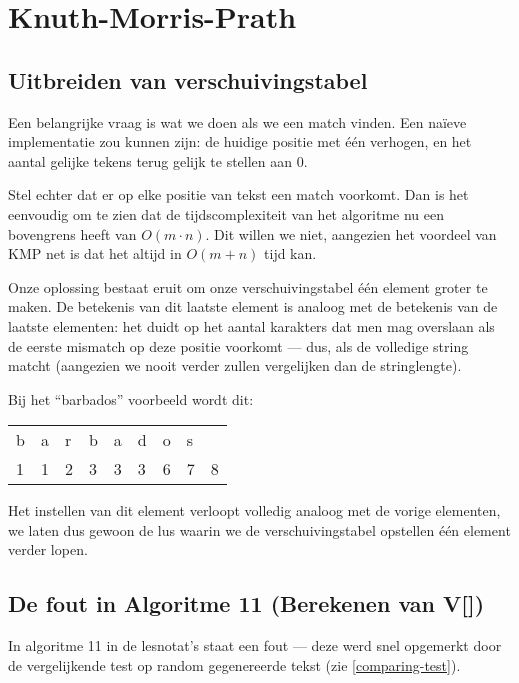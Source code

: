 \documentclass[a4paper,11pt]{article}
\begin{document}
\section{Knuth-Morris-Prath}

\subsection{Uitbreiden van verschuivingstabel}

Een belangrijke vraag is wat we doen als we een match vinden. Een na\"ieve
implementatie zou kunnen zijn: de huidige positie met \'e\'en verhogen, en het
aantal gelijke tekens terug gelijk te stellen aan 0.

Stel echter dat er op elke positie van tekst een match voorkomt. Dan is
het eenvoudig om te zien dat de tijdscomplexiteit van het algoritme nu een
bovengrens heeft van $O(m \cdot n)$. Dit willen we niet, aangezien het voordeel
van KMP net is dat het altijd in $O(m + n)$ tijd kan.

Onze oplossing bestaat eruit om onze verschuivingstabel \'e\'en element groter
te maken. De betekenis van dit laatste element is analoog met de betekenis van
de laatste elementen: het duidt op het aantal karakters dat men mag overslaan
als de eerste mismatch op deze positie voorkomt — dus, als de volledige string
matcht (aangezien we nooit verder zullen vergelijken dan de stringlengte).

Bij het “barbados” voorbeeld wordt dit:

\begin{center}
\begin{tabular}{lllllllll}
b & a & r & b & a & d & o & s &   \\
1 & 1 & 2 & 3 & 3 & 3 & 6 & 7 & 8 \\
\end{tabular}
\end{center}

Het instellen van dit element verloopt volledig analoog met de vorige elementen,
we laten dus gewoon de lus waarin we de verschuivingstabel opstellen \'e\'en
element verder lopen.

\subsection{De fout in Algoritme 11 (Berekenen van V[])}

In algoritme 11 in de lesnotat's staat een fout — deze werd snel opgemerkt door
de vergelijkende test op random gegenereerde tekst (zie \ref{comparing-test}).
\end{document}
